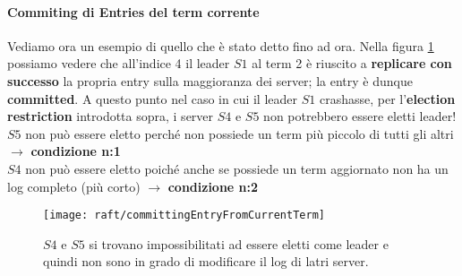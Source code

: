   \paragraph{Commiting di Entries del term corrente}
  Vediamo ora un esempio di quello che è stato detto fino ad ora. Nella figura \ref{fig:figure11} possiamo vedere che all'indice 4 il leader $S1$ al term 2 è riuscito a \textbf{replicare con successo} la propria entry sulla maggioranza dei server; la entry è dunque \textbf{committed}. A questo punto nel caso in cui il leader $S1$ crashasse, per l'\textbf{election restriction} introdotta sopra, i server $S4$ e $S5$ non potrebbero essere eletti leader!\\
  $S5$ non può essere eletto perché non possiede un term più piccolo di tutti gli altri $\rightarrow$ \textbf{condizione n:1}\\
  $S4$ non può essere eletto poiché anche se possiede un term aggiornato non ha un log completo (più corto) $\rightarrow$ \textbf{condizione n:2} 

  \begin{figure}[H]
    \centering
    \texttt{[image: raft/committingEntryFromCurrentTerm]}
    \caption[stateDiagramCaption]{$S4$ e $S5$ si trovano impossibilitati ad essere eletti come leader e quindi non sono in grado di modificare il log di latri server.}
    \label{fig:figure11}
  \end{figure}

